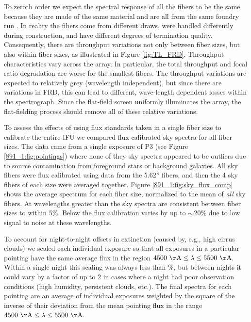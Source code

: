 To zeroth order we expect the spectral response of all the \GP fibers
to be the same because they are made of the same material and are all
from the same foundry run \citep{Wood12}. In reality the \GP fibers
come from different draws, were handled differently during
construction, and have different degrees of termination quality.
Consequently, there are throughput variations not only between fiber
sizes, but also within fiber sizes, as illustrated in Figure
\ref{fig:TL_FRD}.  Throughput characteristics vary across the \GP
array. In particular, the total throughput and focal ratio degradation
are worse for the smallest fibers. The throughput variations are
expected to relatively grey (wavelength independent), but since there
are variations in FRD, this can lead to different, wave-length
dependent losses within the spectrograph. Since the flat-field screen
uniformly illuminates the array, the flat-fielding process should
remove all of these relative variations.

To assess the effects of using flux standards taken in a single fiber
size to calibrate the entire \GP IFU we compared flux calibrated sky
spectra for all fiber sizes. The data came from a single exposure of
P3 (see Figure \ref{891_1:fig:pointings}) where none of they sky spectra
appeared to be outliers due to source contamination from foreground
stars or background galaxies.  All sky fibers were flux calibrated
using data from the 5.62'' fibers, and then the 4 sky fibers of each
size were averaged together. Figure \ref{891_1:fig:sky_flux_comp} shows the
average spectrum for each fiber size, normalized to the mean of
\emph{all} sky fibers. At wavelengths greater than  the
sky spectra are consistent between fiber sizes to within 5\%. Below
 the flux calibration varies by up to ${\sim}$20\% due
to low signal to noise at these wavelengths.


To account for night-to-night offsets in extinction (caused by, e.g.,
high cirrus clouds) we scaled each individual exposure so that all
exposures in a particular pointing have the same average flux in the
region $\val{4500}{\AA} \leq \lambda \leq \val{5500}{\AA}$. Within a
single night this scaling was always less than \%, but between
nights it could vary by a factor of up to 2 in cases where a night had
poor observation conditions (high humidity, persistent clouds,
etc.). The final spectra for each pointing are an average of
individual exposures weighted by the square of the inverse of their
deviation from the mean pointing flux in the range $\val{4500}{\AA}
\leq \lambda \leq \val{5500}{\AA}$.

